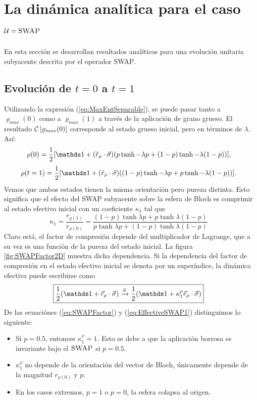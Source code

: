 \section{La dinámica analítica para el caso $\mathcal{U}=\textsc{SWAP}$}
En esta sección se desarrollan resultados analíticos para una evolución unitaria subyacente descrita por el operador \textsc{SWAP}.

\subsection{Evolución de $t=0$ a $t=1$}

Utilizando la expresión (\ref{eq:MaxEntSeparable}), se puede pasar tanto a $\varrho_{max}(0)$ como a $\varrho_{max}(1)$ a través de la aplicación de grano grueso. El resultado $\mathcal{C}\left[\varrho_{max}(0)\right]$ corresponde al estado grueso inicial, pero en términos de $\lambda$. Así:
\begin{equation}
\rho(0)=\frac{1}{2}[\Id+(\hat{r}_{\rho}\cdot\vec{\sigma})(p\tanh{-\lambda p}+(1-p)\tanh{-\lambda (1-p)})],
\end{equation}
\begin{equation}
\rho(t=1)=\frac{1}{2}[\Id+(\hat{r}_{\rho}\cdot\vec{\sigma})((1-p)\tanh{-\lambda p}+p\tanh{-\lambda (1-p)})].
\end{equation}
Vemos que ambos estados tienen la misma orientación pero pureza distinta. Esto significa que el efecto del \textsc{SWAP} subyacente sobre la esfera de Bloch es comprimir al estado efectivo inicial con un coeficiente $\kappa_{1}$ tal que
\begin{equation}\label{eq:SWAPFactor}
  \kappa_{1}=\frac{r_{\rho(1)}}{r_{\rho(0)}}=\frac{(1-p)\tanh{\lambda p}+p\tanh{\lambda (1-p)}}{
    p\tanh{\lambda p}+(1-p)\tanh{\lambda (1-p)}}
\end{equation}
Claro está, el factor de compresión depende del multiplicador de Lagrange, que a su vez es una función de la pureza del estado inicial. La figura \ref{fig:SWAPFactor2D} muestra dicha dependencia. Si la dependencia del factor de compresión en el estado efectivo inicial se denota por un superíndice, la dinámica efectiva puede escribirse como
\begin{equation}\label{eq:EffectiveSWAP1}
  \boxed{\frac{1}{2}(\Id+\vec{r}_{\rho}\cdot\vec{\sigma}) \xrightarrow{S} \frac{1}{2}(\Id+\kappa_{1}^{\rho}\vec{r}_{\rho}\cdot\vec{\sigma})}
\end{equation}
De las ecuaciónes (\ref{eq:SWAPFactor}) y (\ref{eq:EffectiveSWAP1}) distinguimos lo siguiente:
\begin{itemize}
  \item Si $p=0.5$, entonces $\kappa_{1}^{\rho}=1$. Esto se debe a que la aplicación borrosa es invariante bajo el $\textsc{SWAP}$ si $p=0.5$.
  \item $\kappa_{1}^{\rho}$ no depende de la orientación del vector de Bloch, únicamente depende de la magnitud $r_{\rho(0)}$ y $p$.
  \item En los casos extremos, $p=1$ o $p=0$, la esfera colapsa al origen.
\end{itemize}

